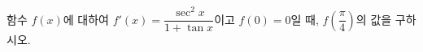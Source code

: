 함수 $f(x)$에 대하여 $f'(x)=\dfrac{\sec^2 x}{1+\tan x}$이고 $f(0)=0$일 때, $f\!\left(\dfrac{\pi}{4}\right)$의 값을 구하시오.
